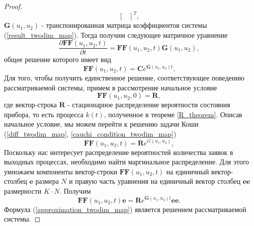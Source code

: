 \begin{proof}
\begin{equation*}
\begin{bmatrix}
		\end{bmatrix}^{T},
	\end{equation*}
	$\boldsymbol{G}(u_{1},u_{2})$ - транспонированная матрица коэффициентов системы (\ref{result_twodim_map}).
	Тогда получим следующее матричное уравнение
	\begin{equation*}
		\frac{{\partial \boldsymbol{FF}(u_{1},u_{2},t)}}{{\partial t}} =\boldsymbol{FF}(u_{1},u_{2},t)\boldsymbol{G}(u_{1},u_{2}),
	\end{equation*}
	общее решение которого имеет вид
	\begin{equation} \label{diff_twodim_map}
		\boldsymbol{FF}(u_{1},u_{2},t)=\boldsymbol{C}e^{\boldsymbol{G}(u_{1},u_{2})t}.
	\end{equation}
	Для того, чтобы получить единственное решение, соответствующее поведению рассматриваемой системы, примем в рассмотрение начальное условие
	\begin{equation} \label{cauchi_condition_twodim_map}
		\boldsymbol{FF}(u_{1},u_{2},0)=\boldsymbol{R},
	\end{equation}
	где вектор-строка $\boldsymbol{R}$ - стационарное распределение вероятности состояния прибора, то есть процесса $k(t)$, полученное в теореме \ref{R_theorem}.
	Описав начальное условие, мы можем перейти к решению задачи Коши (\ref{diff_twodim_map}, \ref{cauchi_condition_twodim_map})
	\begin{equation*} 
		\boldsymbol{FF}(u_{1},u_{2},t)=\boldsymbol{R}e^{G(u_{1},u_{2})},
	\end{equation*}
	Поскольку нас интересует распределение вероятностей количества заявок в выходных процессах, необходимо найти маргинальное распределение. Для этого умножаем компоненты вектор-строки $\boldsymbol{FF}(u_{1},u_{2},t)$ на единичный вектор-столбец $\boldsymbol{e}$ размера $N$ и правую часть уравнения на единичный вектор столбец $\boldsymbol{ee}$ размерности $K \cdot N$. Получим
	\begin{equation}\label{approximation_twodim_map}
		\boldsymbol{FF}(u_{1},u_{2},t)\boldsymbol{e}=\boldsymbol{R}e^{\boldsymbol{G}(u_{1},u_{2})t}\boldsymbol{ee}.
	\end{equation}
	Формула (\ref{approximation_twodim_map}) является решением рассматриваемой системы. 
\end{proof}

